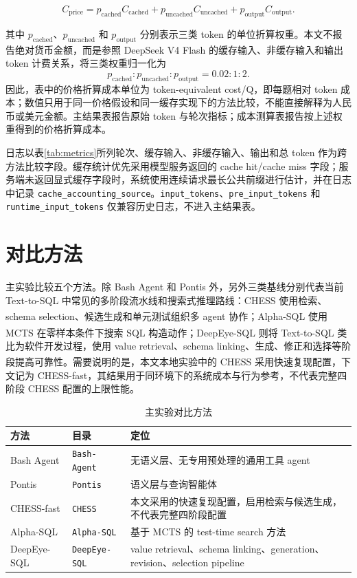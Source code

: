 \documentclass[
    bachelor,
    pdflinks,
]{xjtuthesis}
\newcommand{\upcite}[1]{\textsuperscript{\cite{#1}}}
\newcommand{\topcaption}[1]{\caption{#1}}
\begin{document}
\begin{equation}
C_{\mathrm{price}} =
p_{\mathrm{cached}} C_{\mathrm{cached}}+
p_{\mathrm{uncached}} C_{\mathrm{uncached}}+
p_{\mathrm{output}} C_{\mathrm{output}} .
\end{equation}

其中 $p_{\mathrm{cached}}$、$p_{\mathrm{uncached}}$ 和 $p_{\mathrm{output}}$ 分别表示三类 token 的单位折算权重。本文不报告绝对货币金额，而是参照 DeepSeek V4 Flash 的缓存输入、非缓存输入和输出 token 计费关系，将三类权重归一化为
\[
p_{\mathrm{cached}}:p_{\mathrm{uncached}}:p_{\mathrm{output}}=0.02:1:2 .
\]
因此，表中的价格折算成本单位为 token-equivalent cost/Q，即每题相对 token 成本；数值只用于同一价格假设和同一缓存实现下的方法比较，不能直接解释为人民币或美元金额。主结果表报告原始 token 与轮次指标；成本测算表报告按上述权重得到的价格折算成本。

日志以表\ref{tab:metrics}所列轮次、缓存输入、非缓存输入、输出和总 token 作为跨方法比较字段。缓存统计优先采用模型服务返回的 cache hit/cache miss 字段；服务端未返回显式缓存字段时，系统使用连续请求最长公共前缀进行估计，并在日志中记录 \texttt{cache\_accounting\_source}。\texttt{input\_tokens}、\texttt{pre\_input\_tokens} 和 \texttt{runtime\_input\_tokens} 仅兼容历史日志，不进入主结果表。

\section{对比方法}

主实验比较五个方法。除 Bash Agent 和 Pontis 外，另外三类基线分别代表当前 Text-to-SQL 中常见的多阶段流水线和搜索式推理路线：CHESS 使用检索、schema selection、候选生成和单元测试组织多 agent 协作\upcite{talaei2024chess}；Alpha-SQL 使用 MCTS 在零样本条件下搜索 SQL 构造动作\upcite{li2025alphasql}；DeepEye-SQL 则将 Text-to-SQL 类比为软件开发过程，使用 value retrieval、schema linking、生成、修正和选择等阶段提高可靠性\upcite{li2025deepeyesql}。需要说明的是，本文本地实验中的 CHESS 采用快速复现配置，下文记为 CHESS-fast，其结果用于同环境下的系统成本与行为参考，不代表完整四阶段 CHESS 配置的上限性能。

\begin{table}[htbp]\small
  \centering
  \topcaption{主实验对比方法}
  \label{tab:baselines}
  \begin{tabularx}{\textwidth}{llX}
    \toprule[1.5pt]
    \textbf{方法} & \textbf{目录} & \textbf{定位} \\
    \midrule[1pt]
    Bash Agent & \texttt{Bash-Agent} & 无语义层、无专用预处理的通用工具 agent \\
    Pontis & \texttt{Pontis} & 语义层与查询智能体 \\
    CHESS-fast & \texttt{CHESS} & 本文采用的快速复现配置，启用检索与候选生成，不代表完整四阶段配置 \\
    Alpha-SQL & \texttt{Alpha-SQL} & 基于 MCTS 的 test-time search 方法 \\
    DeepEye-SQL & \texttt{DeepEye-SQL} & value retrieval、schema linking、generation、revision、selection pipeline \\
    \bottomrule[1.5pt]
  \end{tabularx}
\end{table}
\end{document}
